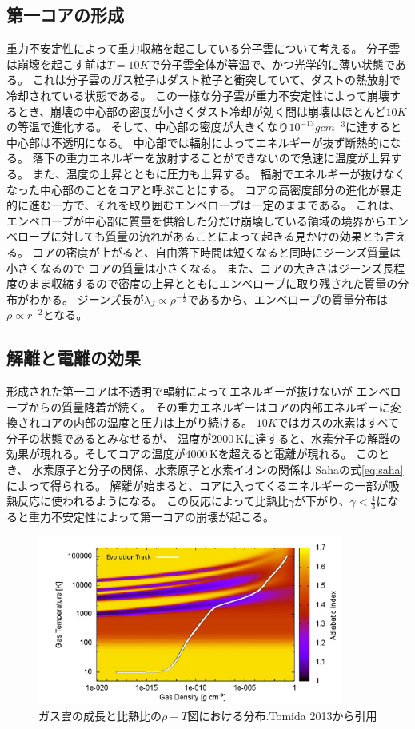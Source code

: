 \documentclass[a4j, dvipdfmx]{jsarticle}
\newcommand{\half}{\frac{1}{2}}
\begin{document}
\subsection{第一コアの形成}
重力不安定性によって重力収縮を起こしている分子雲について考える。
分子雲は崩壊を起こす前は$T=10K$で分子雲全体が等温で、かつ光学的に薄い状態である。
これは分子雲のガス粒子はダスト粒子と衝突していて、ダストの熱放射で冷却されている状態である。
この一様な分子雲が重力不安定性によって崩壊するとき、崩壊の中心部の密度が小さくダスト冷却が効く間は崩壊はほとんど$10K$の等温で進化する。
そして、中心部の密度が大きくなり$10^{-13}gcm^{-3}$に達すると中心部は不透明になる。
中心部では輻射によってエネルギーが抜ず断熱的になる。
落下の重力エネルギーを放射することができないので急速に温度が上昇する。
また、温度の上昇とともに圧力も上昇する。
輻射でエネルギーが抜けなくなった中心部のことをコアと呼ぶことにする。
コアの高密度部分の進化が暴走的に進む一方で、それを取り囲むエンベロープは一定のままである。
これは、エンベロープが中心部に質量を供給した分だけ崩壊している領域の境界からエンベロープに対しても質量の流れがあることによって起きる見かけの効果とも言える。
コアの密度が上がると、自由落下時間は短くなると同時にジーンズ質量は小さくなるので
コアの質量は小さくなる。
また、コアの大きさはジーンズ長程度のまま収縮するので密度の上昇とともにエンベロープに取り残された質量の分布がわかる。
ジーンズ長が$\lambda_J \propto \rho^{-\half}$であるから、エンベロープの質量分布は
$\rho \propto r^{-2}$となる。
\subsection{解離と電離の効果}
形成された第一コアは不透明で輻射によってエネルギーが抜けないが
エンベロープからの質量降着が続く。
その重力エネルギーはコアの内部エネルギーに変換されコアの内部の温度と圧力は上がり続ける。
$10K$ではガスの水素はすべて分子の状態であるとみなせるが、
温度が$2000\,\mathrm{K}$に達すると、水素分子の解離の効果が現れる。そしてコアの温度が$4000\,\mathrm{K}$を超えると電離が現れる。
このとき、
水素原子と分子の関係、水素原子と水素イオンの関係は
Sahaの式\eqref{eq:saha}によって得られる。
解離が始まると、コアに入ってくるエネルギーの一部が吸熱反応に使われるようになる。
この反応によって比熱比$\gamma$が下がり、$\gamma < \frac{4}{3}$になると重力不安定性によって第一コアの崩壊が起こる。
\begin{figure}[t]
    \includegraphics[clip,width=10.0cm]{graph/tomida.png}
    \caption{ガス雲の成長と比熱比の$\rho - T$図における分布.Tomida 2013\cite{tomida}から引用}
    \label{fig:tomida}
\end{figure}
\end{document}
